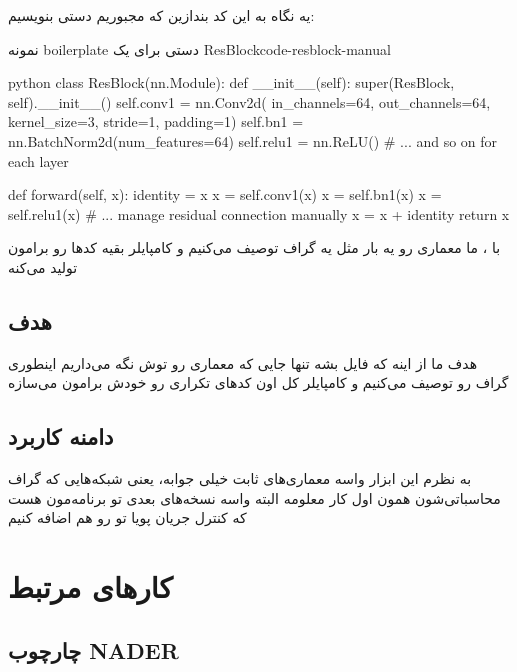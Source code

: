 \documentclass{nngraph-fa}
\begin{document}
یه نگاه به این کد  بندازین که مجبوریم دستی بنویسیم:

\begin{codebox}{نمونه boilerplate دستی برای یک ResBlock}{code-resblock-manual}
\begin{amzcode}{python}
class ResBlock(nn.Module):
    def __init__(self):
        super(ResBlock, self).__init__()
        self.conv1 = nn.Conv2d(
            in_channels=64, out_channels=64,
            kernel_size=3, stride=1, padding=1)
        self.bn1   = nn.BatchNorm2d(num_features=64)
        self.relu1 = nn.ReLU()
        # ... and so on for each layer

    def forward(self, x):
        identity = x
        x = self.conv1(x)
        x = self.bn1(x)
        x = self.relu1(x)
        # ... manage residual connection manually
        x = x + identity
        return x
\end{amzcode}
\end{codebox}

با ، ما معماری رو یه بار مثل یه گراف توصیف می‌کنیم و کامپایلر بقیه کدها رو برامون تولید می‌کنه

\section{هدف}

هدف ما از  اینه که فایل  بشه تنها جایی که معماری رو توش نگه می‌داریم
اینطوری گراف رو توصیف می‌کنیم و کامپایلر کل اون کدهای تکراری رو خودش برامون می‌سازه

\section{دامنه کاربرد}

به نظرم این ابزار واسه معماری‌های ثابت خیلی جوابه، یعنی شبکه‌هایی که گراف محاسباتی‌شون همون اول کار معلومه
البته واسه نسخه‌های بعدی تو برنامه‌مون هست که کنترل جریان پویا تو  رو هم اضافه کنیم

\chapter{کارهای مرتبط}

\section{چارچوب NADER}
\end{document}
